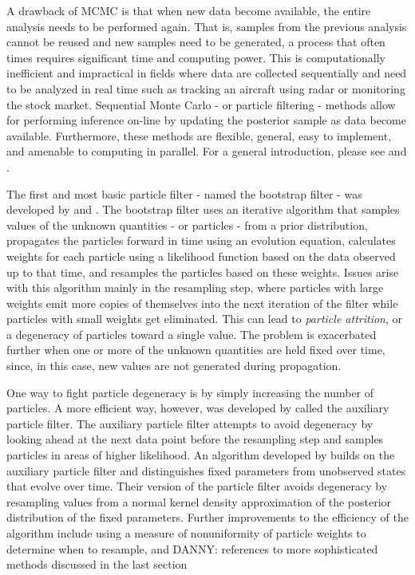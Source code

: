 \documentclass{elsarticle}
\newcommand{\danny}[1]{{\color{blue}DANNY: #1}}
\begin{document}
A drawback of MCMC is that when new data become available, the entire analysis needs to be performed again.  That is, samples from the previous analysis cannot be reused and new samples need to be generated, a process that often times requires significant time and computing power.  This is computationally inefficient and impractical in fields where data are collected sequentially and need to be analyzed in real time such as tracking an aircraft using radar or monitoring the stock market.  Sequential Monte Carlo - or particle filtering - methods allow for performing inference on-line by updating the posterior sample as data become available.  Furthermore, these methods are flexible, general, easy to implement, and amenable to computing in parallel. For a general introduction, please see \cite{Douc:deFr:Gord:sequ:2001} and \cite{cappe2007overview}. 

The first and most basic particle filter - named the bootstrap filter - was developed by \citet{Gord:Salm:Smit:nove:1993} and \citet{Kita:mont:1996} .  The bootstrap filter uses an iterative algorithm that samples values of the unknown quantities - or particles - from a prior distribution, propagates the particles forward in time using an evolution equation, calculates weights for each particle using a likelihood function based on the data observed up to that time, and resamples the particles based on these weights.  Issues arise with this algorithm mainly in the resampling step, where particles with large weights emit more copies of themselves into the next iteration of the filter while particles with small weights get eliminated.  This can lead to \emph{particle attrition}, or a degeneracy of particles toward a single value.  The problem is exacerbated further when one or more of the unknown quantities are held fixed over time, since, in this case, new values are not generated during propagation.

One way to fight particle degeneracy is by simply increasing the number of particles.  A more efficient way, however, was developed by \citet{Pitt:Shep:filt:1999} called the auxiliary particle filter.  The auxiliary particle filter attempts to avoid degeneracy by looking ahead at the next data point before the resampling step and samples particles in areas of higher likelihood.  An algorithm developed by \citet{Liu:West:comb:2001} builds on the auxiliary particle filter and distinguishes fixed parameters from unobserved states that evolve over time.  Their version of the particle filter avoids degeneracy by resampling values from a normal kernel density approximation of the posterior distribution of the fixed parameters.  Further improvements to the efficiency of the algorithm include using a measure of nonuniformity of particle weights to determine when to resample, and \danny{references to more sophisticated methods discussed in the last section}
\end{document}
